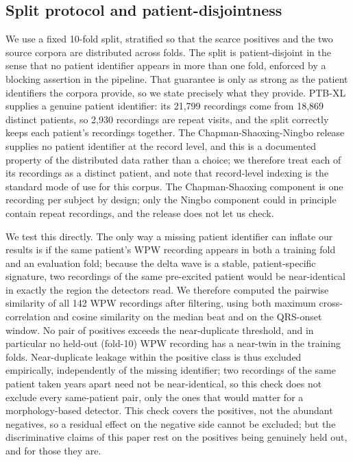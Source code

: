 \documentclass[11pt]{article}
\begin{document}
\subsection{Split protocol and patient-disjointness}
\label{sec:split}

We use a fixed 10-fold split, stratified so that the scarce positives and the two source corpora are distributed across folds. The split is patient-disjoint in the sense that no patient identifier appears in more than one fold, enforced by a blocking assertion in the pipeline. That guarantee is only as strong as the patient identifiers the corpora provide, so we state precisely what they provide. PTB-XL supplies a genuine patient identifier: its 21{,}799 recordings come from 18{,}869 distinct patients, so 2{,}930 recordings are repeat visits, and the split correctly keeps each patient's recordings together. The Chapman-Shaoxing-Ningbo release supplies no patient identifier at the record level, and this is a documented property of the distributed data rather than a choice; we therefore treat each of its recordings as a distinct patient, and note that record-level indexing is the standard mode of use for this corpus. The Chapman-Shaoxing component is one recording per subject by design; only the Ningbo component could in principle contain repeat recordings, and the release does not let us check.

We test this directly. The only way a missing patient identifier can inflate our results is if the same patient's WPW recording appears in both a training fold and an evaluation fold; because the delta wave is a stable, patient-specific signature, two recordings of the same pre-excited patient would be near-identical in exactly the region the detectors read. We therefore computed the pairwise similarity of all 142 WPW recordings after filtering, using both maximum cross-correlation and cosine similarity on the median beat and on the QRS-onset window. No pair of positives exceeds the near-duplicate threshold, and in particular no held-out (fold-10) WPW recording has a near-twin in the training folds. Near-duplicate leakage within the positive class is thus excluded empirically, independently of the missing identifier; two recordings of the same patient taken years apart need not be near-identical, so this check does not exclude every same-patient pair, only the ones that would matter for a morphology-based detector. This check covers the positives, not the abundant negatives, so a residual effect on the negative side cannot be excluded; but the discriminative claims of this paper rest on the positives being genuinely held out, and for those they are.
\end{document}
